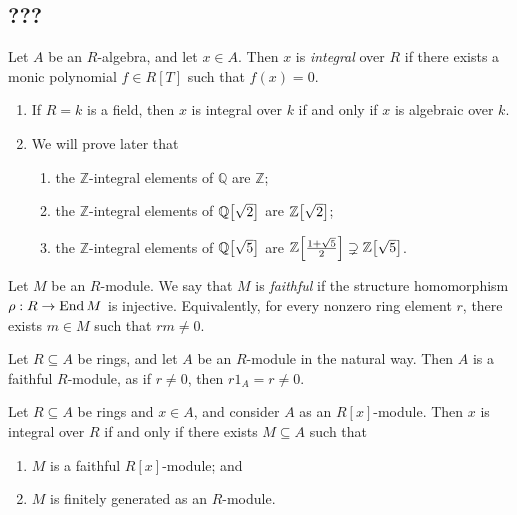 \subsection{???}
\begin{definition}
    Let \( A \) be an \( R \)-algebra, and let \( x \in A \).
    Then \( x \) is \emph{integral} over \( R \) if there exists a monic polynomial \( f \in R[T] \) such that \( f(x) = 0 \). 
\end{definition}
\begin{example}
    \begin{enumerate}
        \item If \( R = k \) is a field, then \( x \) is integral over \( k \) if and only if \( x \) is algebraic over \( k \).
        \item We will prove later that
        \begin{enumerate}
            \item the \( \mathbb Z \)-integral elements of \( \mathbb Q \) are \( \mathbb Z \);
            \item the \( \mathbb Z \)-integral elements of \( \mathbb Q\qty[\sqrt{2}] \) are \( \mathbb Z\qty[\sqrt{2}] \);
            \item the \( \mathbb Z \)-integral elements of \( \mathbb Q\qty[\sqrt{5}] \) are \( \mathbb Z\qty[\frac{1+\sqrt{5}}{2}] \supsetneq \mathbb Z\qty[\sqrt{5}] \).
        \end{enumerate}
    \end{enumerate}
\end{example}
\begin{definition}
    Let \( M \) be an \( R \)-module.
    We say that \( M \) is \emph{faithful} if the structure homomorphism \( \rho : R \to \operatorname{End} M \) is injective.
    Equivalently, for every nonzero ring element \( r \), there exists \( m \in M \) such that \( rm \neq 0 \).
\end{definition}
\begin{example}
    Let \( R \subseteq A \) be rings, and let \( A \) be an \( R \)-module in the natural way.
    Then \( A \) is a faithful \( R \)-module, as if \( r \neq 0 \), then \( r 1_A = r \neq 0 \).
\end{example}
\begin{proposition}
    Let \( R \subseteq A \) be rings and \( x \in A \), and consider \( A \) as an \( R[x] \)-module.
    Then \( x \) is integral over \( R \) if and only if there exists \( M \subseteq A \) such that
    \begin{enumerate}
        \item \( M \) is a faithful \( R[x] \)-module; and
        \item \( M \) is finitely generated as an \( R \)-module.
    \end{enumerate}
\end{proposition}
